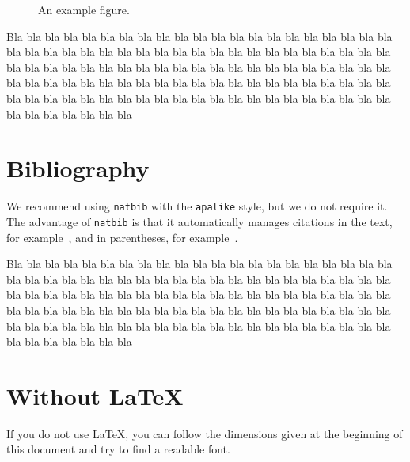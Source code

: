 \documentclass{cap2026}
\begin{document}
\begin{figure}
  \centering
  \caption{An example figure.\label{figcode}}
\end{figure}

Bla bla bla bla bla bla bla bla bla bla bla bla bla bla bla bla bla
bla bla bla bla bla bla bla bla bla bla bla bla bla bla bla bla bla
bla bla bla bla bla bla bla bla bla bla bla bla bla bla bla bla bla
bla bla bla bla bla bla bla bla bla bla bla bla bla bla bla bla bla
bla bla bla bla bla bla bla bla bla bla bla bla bla bla bla bla bla
bla bla bla bla bla bla bla bla bla bla bla bla bla bla bla bla bla
bla bla bla bla bla bla bla bla bla bla



\section{Bibliography}
\label{secla-bibliographie}

We recommend using \texttt{natbib} with the \texttt{apalike} style, but we do not require it. The advantage of \texttt{natbib} is that it automatically manages citations in the text, for example~\citet{paper1}, and in parentheses, for example~\citep{DD14a}.

Bla bla bla bla bla bla bla bla bla bla bla bla bla bla bla bla bla
bla bla bla bla bla bla bla bla bla bla bla bla bla bla bla bla bla
bla bla bla bla bla bla bla bla bla bla bla bla bla bla bla bla bla
bla bla bla bla bla bla bla bla bla bla bla bla bla bla bla bla bla
bla bla bla bla bla bla bla bla bla bla bla bla bla bla bla bla bla
bla bla bla bla bla bla bla bla bla bla bla bla bla bla bla bla bla
bla bla bla bla bla bla bla bla bla bla

\section{Without \LaTeX}
\label{secsans-latex}

If you do not use \LaTeX, you can follow the dimensions given at the beginning of this document and try to find a readable font.




\end{document}
